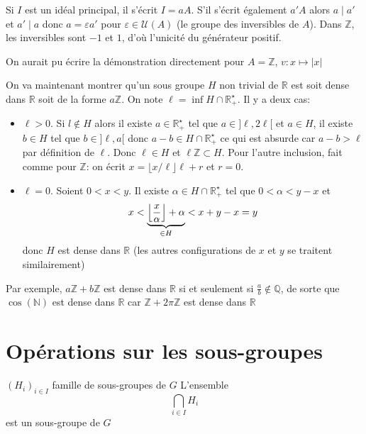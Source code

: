 \begin{rem}
    Si $I$ est un idéal principal, il s'écrit $I=aA$. S'il s'écrit également $a'A$ alors $a\;|\;a'$ et $a'\;|\;a$ donc $a=\varepsilon a'$ pour $\varepsilon\in\mathcal U(A)$ (le groupe des inversibles de $A$). Dans $\mathbb Z$, les inversibles sont $-1$ et $1$, d'où l'unicité du générateur positif.
\end{rem}

\begin{rem}
    On aurait pu écrire la démonstration directement pour $A=\mathbb Z$, $v:x\mapsto |x|$
\end{rem}

On va maintenant montrer qu'un sous groupe $H$ non trivial de $\mathbb R$ est soit dense dans $\mathbb R$ soit de la forme $a\mathbb Z$. On note $\ell=\inf H\cap \mathbb R_+^\star$. Il y a deux cas: \begin{itemize}
    \item $\ell>0$. Si $l\not\in H$ alors il existe $a\in\mathbb R_+^\star$ tel que $a\in ]\ell, 2\ell[$ et $a\in H$, il existe $b\in H$ tel que $b\in ]\ell, a[$ donc $a-b\in H\cap \mathbb R_+^\star$ ce qui est absurde car $a-b>\ell$ par définition de $\ell$. Donc $\ell \in H$ et $\ell \mathbb Z\subset H$. Pour l'autre inclusion, fait comme pour $\mathbb Z$: on écrit $x=\lfloor x/\ell \rfloor \ell + r$ et $r=0$.
    \item $\ell=0$. Soient $0<x<y$. Il existe $\alpha\in H\cap \mathbb R_+^\star$ tel que $0<\alpha<y-x$ et \[
            x<\underbrace{\left\lfloor\frac x\alpha\right\rfloor+\alpha}_{\in H}<x+y-x=y
        \]
        donc $H$ est dense dans $\mathbb R$ (les autres configurations de $x$ et $y$ se traitent similairement)
\end{itemize}

Par exemple, $a\mathbb Z+b\mathbb Z$ est dense dans $\mathbb R$ si et seulement si $\frac ab\not\in \mathbb Q$, de sorte que $ \cos(\mathbb N) $ est dense dans $\mathbb R$ car $\mathbb Z+2\pi\mathbb Z$ est dense dans $\mathbb R$

\section{Opérations sur les sous-groupes}

\begin{prop}
    \Hyp $(H_i)_{i\in I}$ famille de sous-groupes de $G$
    \Conc L'ensemble \[
        \bigcap_{i\in I}H_i
    \]
    est un sous-groupe de $G$
\end{prop}

